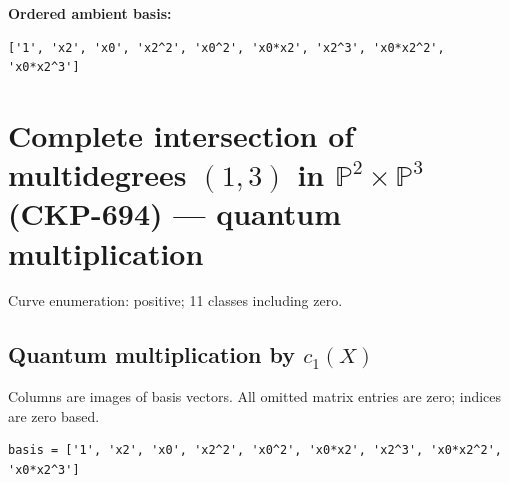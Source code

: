 \documentclass[10pt,a4paper]{article}
\begin{document}
\textbf{Ordered ambient basis:}
\begin{lstlisting}
['1', 'x2', 'x0', 'x2^2', 'x0^2', 'x0*x2', 'x2^3', 'x0*x2^2', 'x0*x2^3']
\end{lstlisting}

\clearpage\section*{Complete intersection of multidegrees $(1,3)$ in $\mathbb P^{2}\times \mathbb P^{3}$ (CKP-694) --- quantum multiplication}

Curve enumeration: positive; 11 classes including zero.
\subsection*{Quantum multiplication by $c_1(X)$}
Columns are images of basis vectors. All omitted matrix entries are zero; indices are zero based.

\begin{lstlisting}
basis = ['1', 'x2', 'x0', 'x2^2', 'x0^2', 'x0*x2', 'x2^3', 'x0*x2^2', 'x0*x2^3']
\end{lstlisting}
\end{document}
